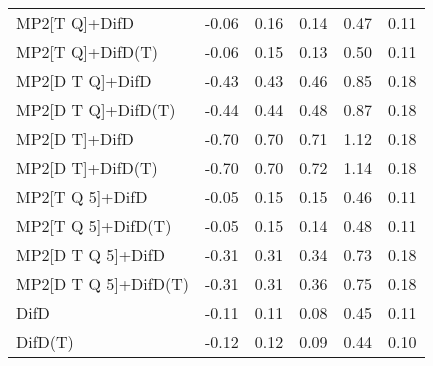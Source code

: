 \begin{table}
\begin{tabular}{l l l l l l }
    MP2[T Q]+DifD & -0.06 & 0.16 & 0.14 & 0.47 & 0.11 \\ 
    MP2[T Q]+DifD(T) & -0.06 & 0.15 & 0.13 & 0.50 & 0.11 \\ 
    MP2[D T Q]+DifD & -0.43 & 0.43 & 0.46 & 0.85 & 0.18 \\ 
    MP2[D T Q]+DifD(T) & -0.44 & 0.44 & 0.48 & 0.87 & 0.18 \\ 
    MP2[D T]+DifD & -0.70 & 0.70 & 0.71 & 1.12 & 0.18 \\ 
    MP2[D T]+DifD(T) & -0.70 & 0.70 & 0.72 & 1.14 & 0.18 \\ 
    MP2[T Q 5]+DifD & -0.05 & 0.15 & 0.15 & 0.46 & 0.11 \\ 
    MP2[T Q 5]+DifD(T) & -0.05 & 0.15 & 0.14 & 0.48 & 0.11 \\ 
    MP2[D T Q 5]+DifD & -0.31 & 0.31 & 0.34 & 0.73 & 0.18 \\ 
    MP2[D T Q 5]+DifD(T) & -0.31 & 0.31 & 0.36 & 0.75 & 0.18 \\ 
    DifD & -0.11 & 0.11 & 0.08 & 0.45 & 0.11 \\ 
    DifD(T) & -0.12 & 0.12 & 0.09 & 0.44 & 0.10 \\ 
    \bottomrule
  \end{tabular}
\end{table}
